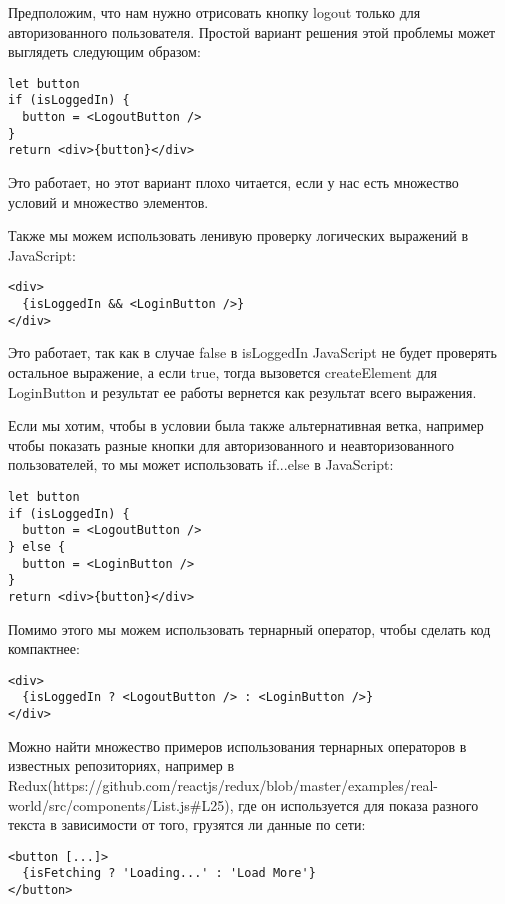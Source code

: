 \documentclass[12pt]{book}
\begin{document}
Предположим, что нам нужно отрисовать кнопку logout только для авторизованного пользователя. Простой вариант решения этой проблемы может выглядеть следующим образом:

\begin{lstlisting}
let button
if (isLoggedIn) {
  button = <LogoutButton />
}
return <div>{button}</div>
\end{lstlisting}
   
Это работает, но этот вариант плохо читается, если у нас есть множество условий и множество элементов.

Также мы можем использовать ленивую проверку логических выражений в JavaScript:

\begin{lstlisting}
<div>
  {isLoggedIn && <LoginButton />}
</div>
\end{lstlisting}

Это работает, так как в случае false в isLoggedIn JavaScript не будет проверять остальное выражение, а если true, тогда вызовется createElement для LoginButton и результат ее работы вернется как результат всего выражения.

Если мы хотим, чтобы в условии была также альтернативная ветка, например чтобы показать разные кнопки для авторизованного и неавторизованного пользователей, то мы может использовать if...else в JavaScript:

\begin{lstlisting}
let button
if (isLoggedIn) {
  button = <LogoutButton />
} else {
  button = <LoginButton />
}
return <div>{button}</div>
\end{lstlisting}
   
Помимо этого мы можем использовать тернарный оператор, чтобы сделать код компактнее:

\begin{lstlisting}
<div>
  {isLoggedIn ? <LogoutButton /> : <LoginButton />}
</div>
\end{lstlisting}

Можно найти множество примеров использования тернарных операторов в известных репозиториях, например в Redux(https://github.com/reactjs/redux/blob/master/examples/real-world/src/components/List.js\#L25), где он используется для показа разного текста в зависимости от того, грузятся ли данные по сети:

\begin{lstlisting}
<button [...]>
  {isFetching ? 'Loading...' : 'Load More'}
</button>
\end{lstlisting}
\end{document}
